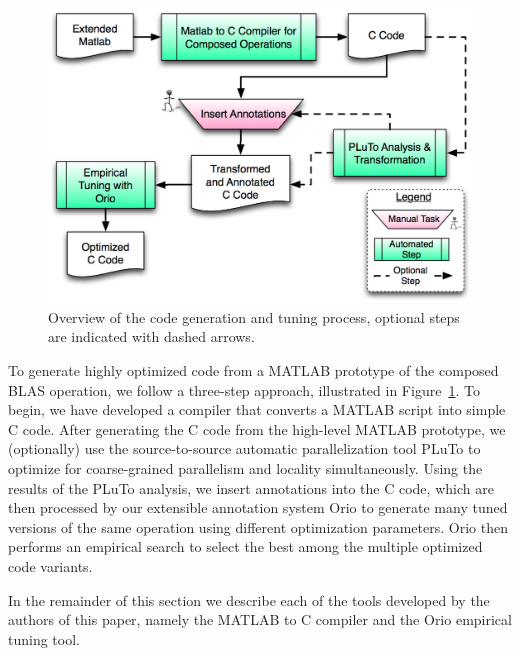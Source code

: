 \documentclass[runningheads]{llncs}
\begin{document}



\begin{figure}[htbp]
\centering
\includegraphics[width=.7\textwidth]{figures/process.png}

\caption{Overview of the code generation and tuning process, optional steps are indicated with dashed arrows.}
\label{fig:process}
\end{figure}
To generate highly optimized code from a MATLAB prototype of the composed BLAS operation, we follow a three-step approach, illustrated in Figure~\ref{fig:process}.  To begin, we have developed a compiler that converts a MATLAB script into simple C code.
After generating the C code from the high-level MATLAB prototype, we (optionally) use the source-to-source automatic parallelization tool PLuTo\cite{Pluto} %
to optimize for coarse-grained parallelism and locality simultaneously. Using the results of the PLuTo analysis, we insert annotations into the C code, which are then processed by our extensible annotation system Orio to generate many tuned versions of the same operation using different optimization parameters. Orio then performs an empirical search to select the best among the multiple optimized code variants.


In the remainder of this section we describe each of the tools developed by the authors of this paper, namely the MATLAB to C compiler and the Orio empirical tuning tool.
\end{document}
